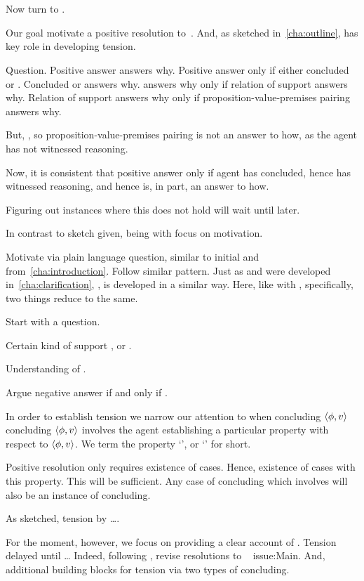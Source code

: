 \chapter{}
\label{cha:zS}

\begin{note}
  Now turn to \zSN{}.

  Our goal motivate a positive resolution to~\issueConstraint{}.
  And, as sketched in~\autoref{cha:outline}, \zSN{} has key role in developing tension.

  Question.
  Positive answer answers why.
  Positive answer only if either concluded or \fc{}.
  Concluded or \fc{} answers why.
  \fc{} answers why only if relation of support answers why.
  Relation of support answers why only if proposition-value-premises pairing answers why.

  But, \fc{}, so proposition-value-premises pairing is not an answer to how, as the agent has not witnessed reasoning.

  Now, it is consistent that positive answer only if agent has concluded, hence has witnessed reasoning, and hence is, in part, an answer to how.

  Figuring out instances where this does not hold will wait until later.


  In contrast to sketch given, being with focus on motivation.

  Motivate \zSN{} via plain language question, similar to initial \qWhy{} and \qHow{} from~\autoref{cha:introduction}.
  Follow similar pattern.
  Just as \qWhy{} and \qHow{} were developed in~\autoref{cha:clarification}, \zSN{}, is developed in a similar way.
  Here, like with \qWhy{}, specifically, two things reduce to the same.
\end{note}

\begin{note}[Map]
  Start with a question.

  Certain kind of support \zSN{}, or \zS{}.

  Understanding of \zS{}.

  Argue negative answer \zS{} if and only if \zetaS{}.
\end{note}

\begin{note}
  In order to establish tension we narrow our attention to when concluding \(\langle \phi, v \rangle\) concluding \(\langle \phi, v \rangle\) involves the agent establishing a particular property with respect to \(\langle \phi, v \rangle\).
  We term the property `', or `\zS{}' for short.

  Positive resolution only requires existence of cases.
  Hence, existence of cases with this property.
  This will be sufficient.
  Any case of concluding which involves \csVImp{} will also be an instance of concluding.

  As sketched, tension by {\color{red} \dots}.

  For the moment, however, we focus on providing a clear account of \csN{}.
  Tension delayed until \dots
  Indeed, following \csN{}, revise resolutions to ~{\color{red} issue:Main}.
  And, additional building blocks for tension via two types of concluding.
\end{note}

